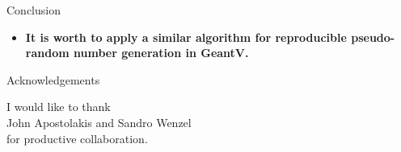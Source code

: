 \documentclass[aspectratio=169, 14pt]{beamer}
\begin{document}
\begin{large}
\begin{frame}{Conclusion}
\begin{itemize}
   \item \bf It is worth to apply a similar algorithm for reproducible pseudo-random number generation in GeantV.
  \end{itemize}

 \end{frame}
 
 \begin{frame}{Acknowledgements}

  \centering
  I would like to thank\\
  John Apostolakis and Sandro Wenzel\\
  for productive collaboration. 

 \end{frame}
 
 
 \appendix
 
 \end{large}
\end{document}

